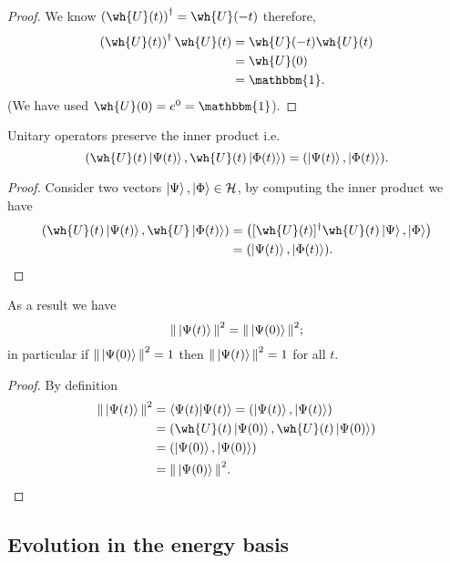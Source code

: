 \documentclass[12pt, a4paper]{article}
\begin{document}
\begin{proof}
    We know \(\left( \wh{U}(t) \right)^{\dagger}=\wh{U}(-t)\) therefore,
    \[\begin{aligned}
        \left( \wh{U}(t) \right)^{\dagger} \wh{U}(t) &= \wh{U}(-t)\wh{U}(t) \\
        &= \wh{U}(0) \\
        &=\mathbbm{1}.
    \end{aligned}\]
    (We have used \(\wh{U}(0)=e^0 = \mathbbm{1}\)).
\end{proof}

\begin{mdthm}
    Unitary operators preserve the inner product i.e.
    \[\left( \wh{U}(t) \ket{\Psi(t)},\wh{U}(t)\ket{\Phi(t)} \right) = (\ket{\Psi(t)},\ket{\Phi(t)}).\]
\end{mdthm}

\begin{proof}
    Consider two vectors \(\ket{\Psi},\ket{\Phi} \in \mathcal{H}\), by computing the inner product we have 
    \[\begin{aligned}
        \left( \wh{U}(t) \ket{\Psi(t)},\wh{U}\ket{\Phi(t)} \right) &= \left( [\wh{U}(t)]^{\dagger} \wh{U}(t)\ket{\Psi},\ket{\Phi} \right) \\
        &= (\ket{\Psi(t)},\ket{\Phi(t)}).
    \end{aligned}\]
\end{proof}

\begin{corollary}
    As a result we have 
    \[\norm{\,\ket{\Psi(t)}\,}^2= \norm{\,\ket{\Psi(0)}\,}^2;\]
    in particular if \(\norm{\,\ket{\Psi(0)}\,}^2=1\) then \(\norm{\,\ket{\Psi(t)}\,}^2=1\) for all \(t\).
\end{corollary}

\begin{proof}
    By definition 
    \[\begin{aligned}
        \norm{\,\ket{\Psi(t)}\,}^2 &= \bra{\Psi(t)} \ket{\Psi(t)} = (\ket{\Psi(t)},\ket{\Psi(t)}) \\
        &= \left( \wh{U}(t) \ket{\Psi(0)}, \wh{U}(t) \ket{\Psi(0)} \right) \\
        &= \left( \ket{\Psi(0)},\ket{\Psi(0)} \right) \\
        &= \norm{\,\ket{\Psi(0)}\,}^2.
    \end{aligned}\]
\end{proof}

\subsection{Evolution in the energy basis}
\end{document}
